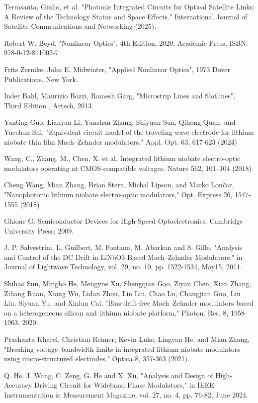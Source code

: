 \documentclass[thesis]{deutez}
\begin{document}
\begin{thebibliography}{30}
         Terrasanta, Giulio, et al. "Photonic Integrated Circuits for Optical Satellite Links: A Review of the Technology Status and Space Effects." International Journal of Satellite Communications and Networking (2025).

         Robert W. Boyd, "Nonlinear Optics", 4th Edition, 2020, Academic Press, ISBN: 978-0-12-811002-7

         Frits Zernike, John E. Midwinter, "Applied Nonlinear Optics", 1973 Dover Publications, New York.

         Inder Bahl, Maurizio Bozzi, Ramesh Garg, "Microstrip Lines and Slotlines", Third Edition , Artech, 2013.

         Yanting Guo, Lianyan Li, Yunshan Zhang, Shiyuan Sun, Qihong Quan, and Yuechun Shi, "Equivalent circuit model of the traveling wave electrode for lithium niobate thin film Mach–Zehnder modulators," Appl. Opt. 63, 617-623 (2024)

         Wang, C., Zhang, M., Chen, X. et al. Integrated lithium niobate electro-optic modulators operating at CMOS-compatible voltages. Nature 562, 101–104 (2018)

         Cheng Wang, Mian Zhang, Brian Stern, Michal Lipson, and Marko Lončar, "Nanophotonic lithium niobate electro-optic modulators," Opt. Express 26, 1547-1555 (2018)

         Ghione G. Semiconductor Devices for High-Speed Optoelectronics. Cambridge University Press; 2009.

         J. P. Salvestrini, L. Guilbert, M. Fontana, M. Abarkan and S. Gille, "Analysis and Control of the DC Drift in LiNbO3 Based Mach–Zehnder Modulators," in Journal of Lightwave Technology, vol. 29, no. 10, pp. 1522-1534, May15, 2011.

         Shihao Sun, Mingbo He, Mengyue Xu, Shengqian Gao, Ziyan Chen, Xian Zhang, Ziliang Ruan, Xiong Wu, Lidan Zhou, Lin Liu, Chao Lu, Changjian Guo, Liu Liu, Siyuan Yu, and Xinlun Cai, "Bias-drift-free Mach–Zehnder modulators based on a heterogeneous silicon and lithium niobate platform," Photon. Res. 8, 1958-1963, 2020.

         Prashanta Kharel, Christian Reimer, Kevin Luke, Lingyan He, and Mian Zhang, "Breaking voltage–bandwidth limits in integrated lithium niobate modulators using micro-structured electrodes," Optica 8, 357-363 (2021).

         Q. He, J. Wang, C. Zeng, G. He and X. Xu, "Analysis and Design of High-Accuracy Driving Circuit for Wideband Phase Modulators," in IEEE Instrumentation \& Measurement Magazine, vol. 27, no. 4, pp. 76-82, June 2024.


\end{thebibliography}
\end{document}
